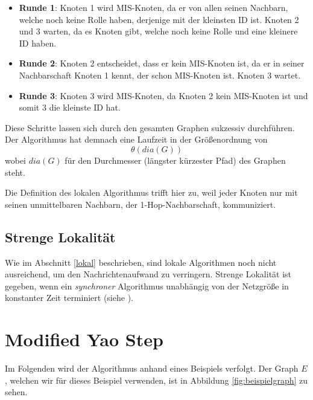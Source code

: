 \documentclass[a4paper,twoside]{IEEEtran}
\begin{document}
\begin{itemize}
\item \textbf{Runde 1}: Knoten 1 wird MIS-Knoten, da er von allen seinen Nachbarn, welche noch keine Rolle haben, derjenige mit der kleinsten ID ist. Knoten 2 und 3 warten, da es Knoten gibt, welche noch keine Rolle und eine kleinere ID haben.

\item \textbf{Runde 2}: Knoten 2 entscheidet, dass er kein MIS-Knoten ist, da er in seiner Nachbarschaft Knoten 1 kennt, der schon MIS-Knoten ist. Knoten 3 wartet.

\item \textbf{Runde 3}: Knoten 3 wird MIS-Knoten, da Knoten 2 kein MIS-Knoten ist und somit 3 die kleinste ID hat. 
\end{itemize}

Diese Schritte lassen sich durch den gesamten Graphen sukzessiv durchführen. 
Der Algorithmus hat demnach eine Laufzeit in der Größenordnung von 
\begin{equation*}
\theta (dia(G)) 
\end{equation*}
wobei $dia(G) $ für den Durchmesser (längster kürzester Pfad) des Graphen steht.

Die Definition des lokalen Algorithmus trifft hier zu, weil jeder Knoten nur mit seinen unmittelbaren Nachbarn, der 1-Hop-Nachbarschaft, kommuniziert.






\subsection{Strenge Lokalität}
Wie im Abschnitt \ref{lokal} beschrieben, sind lokale Algorithmen noch nicht ausreichend, um den Nachrichtenaufwand zu verringern.
Strenge Lokalität ist gegeben, wenn ein \emph{synchroner} Algorithmus unabhängig von der Netzgröße in konstanter Zeit terminiert (siehe \cite{strictlyLocal}).



\section{Modified Yao Step}
Im Folgenden wird der Algorithmus anhand eines Beispiels verfolgt.
Der Graph $E $, welchen wir für dieses Beispiel verwenden, ist in Abbildung \ref{fig:beispielgraph} zu sehen.
\end{document}
